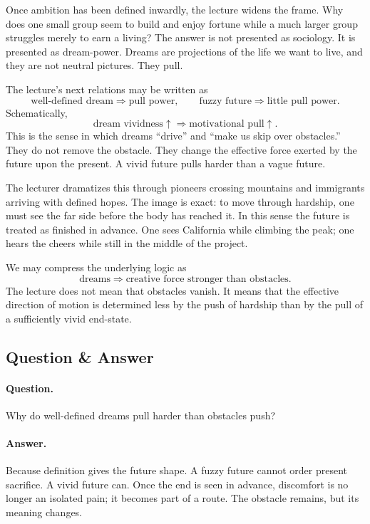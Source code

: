 Once ambition has been defined inwardly, the lecture widens the frame. Why does one small group seem to build and enjoy fortune while a much larger group struggles merely to earn a living? The answer is not presented as sociology. It is presented as dream-power. Dreams are projections of the life we want to live, and they are not neutral pictures. They pull.

The lecture's next relations may be written as
\begin{equation}
\text{well-defined dream}\Rightarrow \text{pull power},
\qquad
\text{fuzzy future}\Rightarrow \text{little pull power}.
\end{equation}
Schematically,
\begin{equation}
\text{dream vividness}\uparrow \Rightarrow \text{motivational pull}\uparrow.
\end{equation}
This is the sense in which dreams ``drive'' and ``make us skip over obstacles.'' They do not remove the obstacle. They change the effective force exerted by the future upon the present. A vivid future pulls harder than a vague future.

The lecturer dramatizes this through pioneers crossing mountains and immigrants arriving with defined hopes. The image is exact: to move through hardship, one must see the far side before the body has reached it. In this sense the future is treated as finished in advance. One sees California while climbing the peak; one hears the cheers while still in the middle of the project.

We may compress the underlying logic as
\begin{equation}
\text{dreams} \Rightarrow \text{creative force stronger than obstacles}.
\end{equation}
The lecture does not mean that obstacles vanish. It means that the effective direction of motion is determined less by the push of hardship than by the pull of a sufficiently vivid end-state.

\subsection{Question \& Answer}

\paragraph{Question.} Why do well-defined dreams pull harder than obstacles push?

\paragraph{Answer.} Because definition gives the future shape. A fuzzy future cannot order present sacrifice. A vivid future can. Once the end is seen in advance, discomfort is no longer an isolated pain; it becomes part of a route. The obstacle remains, but its meaning changes.

